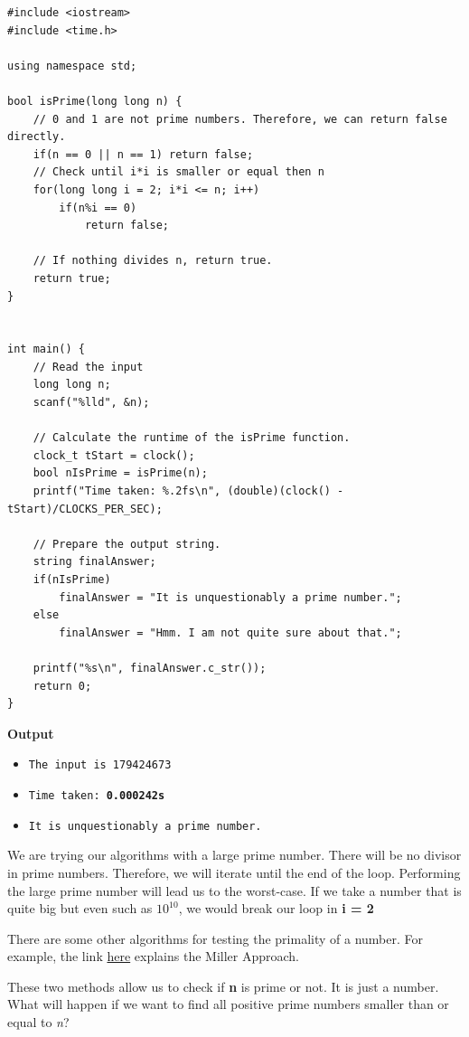 \documentclass[12pt]{article}
\begin{document}
\begin{verbatim}
#include <iostream>
#include <time.h>

using namespace std;

bool isPrime(long long n) {
    // 0 and 1 are not prime numbers. Therefore, we can return false directly.
    if(n == 0 || n == 1) return false;
    // Check until i*i is smaller or equal then n
    for(long long i = 2; i*i <= n; i++)
        if(n%i == 0)
            return false;
    
    // If nothing divides n, return true.
    return true;
}


int main() {
    // Read the input
    long long n;
    scanf("%lld", &n);
    
    // Calculate the runtime of the isPrime function.
    clock_t tStart = clock();
    bool nIsPrime = isPrime(n);
    printf("Time taken: %.2fs\n", (double)(clock() - tStart)/CLOCKS_PER_SEC);
    
    // Prepare the output string.
    string finalAnswer;
    if(nIsPrime)
        finalAnswer = "It is unquestionably a prime number.";
    else
        finalAnswer = "Hmm. I am not quite sure about that.";
    
    printf("%s\n", finalAnswer.c_str());
    return 0;
}
\end{verbatim}
\textbf{Output}
\begin{itemize}
  \item \texttt{The input is 179424673} 
  \item \texttt{Time taken: \textbf{0.000242s}} 
  \item \texttt{It is unquestionably a prime number.} \\
\end{itemize}

We are trying our algorithms with a large prime number. There will be no divisor in prime numbers. Therefore, we will iterate until the end of the loop. Performing the large prime number will lead us to the worst-case. If we take a number that is quite big but even such as $10^{10}$, we would break our loop in \textbf{i = 2}

There are some other algorithms for testing the primality of a number. For example, the link \href{https://www.geeksforgeeks.org/primality-test-set-3-miller-rabin/}{here} explains the Miller Approach. 

These two methods allow us to check if \textbf{n} is prime or not. It is just a number. What will happen if we want to find all positive prime numbers smaller than or equal to \textit{n}?
\end{document}

